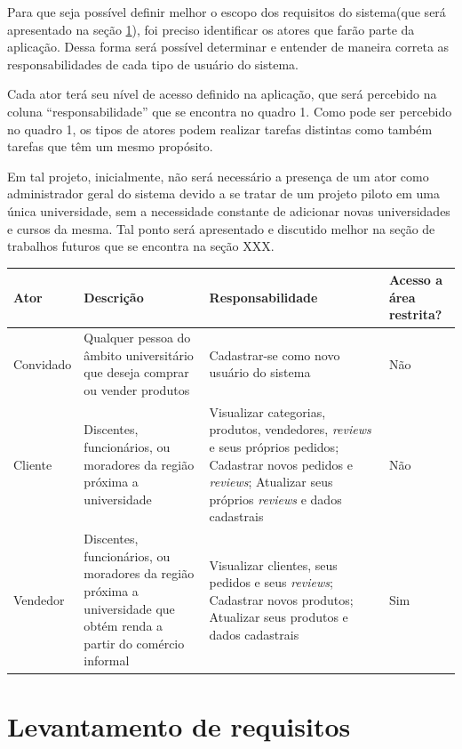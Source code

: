 Para que seja possível definir melhor o escopo dos requisitos do sistema(que será apresentado na seção \ref{requisitos}), foi preciso identificar os atores que farão parte da aplicação. Dessa forma será possível determinar e entender de maneira correta as responsabilidades de cada tipo de usuário do sistema. \par
Cada ator terá seu nível de acesso definido na aplicação, que será percebido na coluna “responsabilidade” que se encontra no quadro 1. Como pode ser percebido no quadro 1, os tipos de atores podem realizar tarefas distintas como também tarefas que têm um mesmo propósito. \par
Em tal projeto, inicialmente, não será necessário a presença de um ator como administrador geral do sistema devido a se tratar de um projeto piloto em uma única universidade, sem a necessidade constante de adicionar novas universidades e cursos da mesma. Tal ponto será apresentado e discutido melhor na seção de trabalhos futuros que se encontra na seção XXX.

\begin{tabularx}{0.9\textwidth} { 
  | >{\raggedright\arraybackslash}X 
  | >{\raggedright\arraybackslash}X 
  | >{\raggedright\arraybackslash}X 
  | >{\raggedright\arraybackslash}X | }
 \hline
 Ator & Descrição & Responsabilidade & Acesso a área restrita? \\
 \hline
 Convidado  & Qualquer pessoa do âmbito universitário que deseja comprar ou vender produtos  & Cadastrar-se como novo usuário do sistema & Não  \\
\hline
Cliente & Discentes, funcionários, ou moradores da região próxima a universidade & Visualizar categorias, produtos, vendedores, \textit{reviews} e seus próprios pedidos; Cadastrar novos pedidos e \textit{reviews}; Atualizar seus próprios \textit{reviews} e dados cadastrais & Não \\
\hline
Vendedor & Discentes, funcionários, ou moradores da região próxima a universidade que obtém renda a partir do comércio informal & Visualizar clientes, seus pedidos e seus \textit{reviews}; Cadastrar novos produtos; Atualizar seus produtos e dados cadastrais & Sim \\
\hline
\end{tabularx}

\section{Levantamento de requisitos}\label{requisitos}

